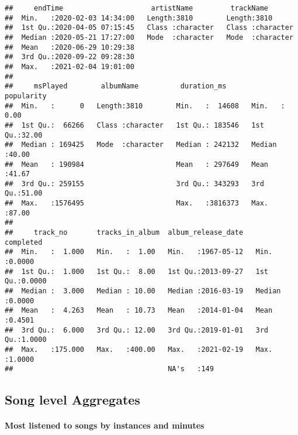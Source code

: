 \documentclass[]{article}
\let\oldparagraph\paragraph
\renewcommand{\paragraph}[1]{\oldparagraph{#1}\mbox{}}
\begin{document}
\begin{verbatim}
##     endTime                     artistName         trackName        
##  Min.   :2020-02-03 14:34:00   Length:3810        Length:3810       
##  1st Qu.:2020-04-05 07:15:45   Class :character   Class :character  
##  Median :2020-05-21 17:27:00   Mode  :character   Mode  :character  
##  Mean   :2020-06-29 10:29:38                                        
##  3rd Qu.:2020-09-22 09:28:30                                        
##  Max.   :2021-02-04 19:01:00                                        
##                                                                     
##     msPlayed        albumName          duration_ms        popularity   
##  Min.   :      0   Length:3810        Min.   :  14608   Min.   : 0.00  
##  1st Qu.:  66266   Class :character   1st Qu.: 183546   1st Qu.:32.00  
##  Median : 169425   Mode  :character   Median : 242132   Median :40.00  
##  Mean   : 190984                      Mean   : 297649   Mean   :41.67  
##  3rd Qu.: 259155                      3rd Qu.: 343293   3rd Qu.:51.00  
##  Max.   :1576495                      Max.   :3816373   Max.   :87.00  
##                                                                        
##     track_no       tracks_in_album  album_release_date     completed     
##  Min.   :  1.000   Min.   :  1.00   Min.   :1967-05-12   Min.   :0.0000  
##  1st Qu.:  1.000   1st Qu.:  8.00   1st Qu.:2013-09-27   1st Qu.:0.0000  
##  Median :  3.000   Median : 10.00   Median :2016-03-19   Median :0.0000  
##  Mean   :  4.263   Mean   : 10.73   Mean   :2014-01-04   Mean   :0.4501  
##  3rd Qu.:  6.000   3rd Qu.: 12.00   3rd Qu.:2019-01-01   3rd Qu.:1.0000  
##  Max.   :175.000   Max.   :400.00   Max.   :2021-02-19   Max.   :1.0000  
##                                     NA's   :149
\end{verbatim}

\hypertarget{song-level-aggregates}{%
\subsection{Song level Aggregates}\label{song-level-aggregates}}

\hypertarget{most-listened-to-songs-by-instances-and-minutes}{%
\paragraph{Most listened to songs by instances and
minutes}\label{most-listened-to-songs-by-instances-and-minutes}}
\end{document}
